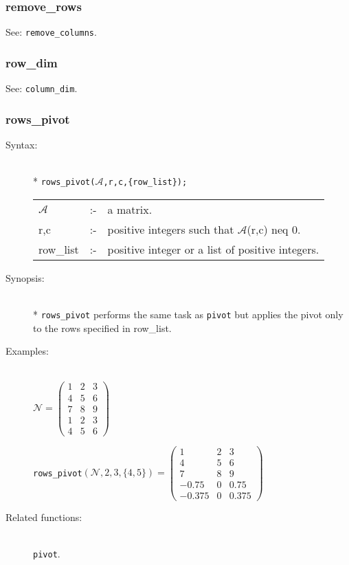 \subsubsection{remove\_rows}
\label{linalg:remove_rows}
\hypertarget{operator:REMOVE_ROWS}{}
See: \texttt{remove\_columns}.


\subsubsection{row\_dim}
\label{linalg:row_dim}
\hypertarget{operator:ROW_DIM}{}

See: \texttt{column\_dim}.


\subsubsection{rows\_pivot}
\label{linalg:rows_pivot}
\hypertarget{operator:ROWS_PIVOT}{}

\begin{description}
\item[Syntax:]\mbox{}\\*
\texttt{rows\_pivot($\mathcal{A}$,r,c,\{row\_list\});}\\[2mm]
\begin{tabular}{l l l}
$\mathcal{A}$ &:-& a matrix. \\
r,c        &:-& positive integers such that $\mathcal{A}$(r,c) neq 0.\\
row\_list  &:-& positive integer or a list of positive integers.
\end{tabular}

\item[Synopsis:]\mbox{}\\*
\texttt{rows\_pivot} performs the same task as \texttt{pivot} but applies
the pivot only to the rows specified in row\_list.

\item[Examples:]\mbox{}\\
  \(\mathcal{N} = \begin{pmatrix} 1 & 2 & 3 \\ 4 & 5 & 6 \\ 7 & 8 &
    9 \\1 & 2 & 3 \\ 4 & 5 & 6 \end{pmatrix}\)

  \texttt{rows\_pivot}\((\mathcal{N},2,3,\{4,5\}) = \begin{pmatrix}
    1 & 2 & 3 \\ 4 & 5 & 6 \\ 7 & 8 & 9 \\ -0.75 & 0 & 0.75 \\
    -0.375 & 0 & 0.375
  \end{pmatrix}\)

\item[Related functions:]\mbox{}\\
\texttt{pivot}.
\end{description}


